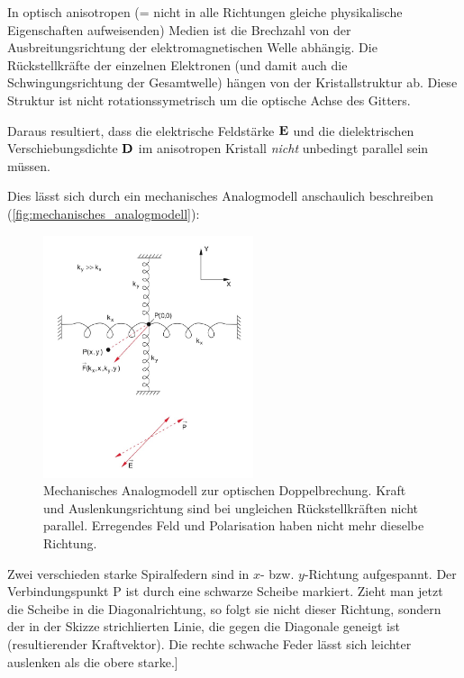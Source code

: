 \documentclass[a4paper, 11pt, ngerman, parskip=half-]{scrartcl}
\begin{document}
In optisch anisotropen (= nicht in alle Richtungen gleiche physikalische Eigenschaften aufweisenden) Medien ist die Brechzahl
von der Ausbreitungsrichtung der elektromagnetischen Welle abhängig. Die Rückstellkräfte der einzelnen Elektronen (und damit
auch die Schwingungsrichtung der Gesamtwelle) hängen von der Kristallstruktur ab. Diese Struktur ist nicht rotationssymetrisch um
die optische Achse des Gitters.

Daraus resultiert, dass die elektrische Feldstärke $\vb{E}$ und die dielektrischen Verschiebungsdichte $\vb{D}$ im anisotropen Kristall \textit{nicht} unbedingt parallel sein müssen.

Dies lässt sich durch ein mechanisches Analogmodell anschaulich beschreiben (\autoref{fig:mechanisches_analogmodell}):
%
\begin{figure}[H]
    \centering
    \begin{samepage}
        \includegraphics[width=0.55\textwidth]{image/15/mechanisches_modell.jpg}
        \caption{Mechanisches Analogmodell zur optischen Doppelbrechung. Kraft und Auslenkungsrichtung sind bei ungleichen Rückstellkräften nicht parallel. Erregendes Feld und Polarisation haben nicht mehr dieselbe Richtung.}
        \label{fig:mechanisches_analogmodell}
    \end{samepage}
\end{figure}
%
Zwei verschieden starke Spiralfedern sind in $x$- bzw. $y$-Richtung aufgespannt. Der Verbindungspunkt P ist durch eine schwarze Scheibe markiert. Zieht man jetzt die Scheibe in die Diagonalrichtung, so folgt sie nicht dieser Richtung, sondern der in der Skizze strichlierten Linie, die gegen die Diagonale geneigt ist (resultierender Kraftvektor).
Die rechte schwache Feder lässt sich leichter auslenken als die obere starke.]
\end{document}
